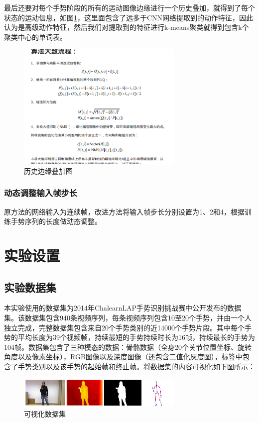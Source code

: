 \documentclass[a4paper, 12pt]{article}
\begin{document}
最后还要对每个手势阶段的所有的运动图像边缘进行一个历史叠加，就得到了每个状态的运动信息，如图\ref{fig:7}，这里面包含了远多于CNN网络提取到的动作特征，因此认为是高级动作特征，然后我们对提取到的特征进行k-means聚类就得到包含k个聚类中心的单词表。

\begin{figure}[ht]
  \centering
  \includegraphics[width=8cm]{canny.png}
  \caption{\label{fig:7}历史边缘叠加图}
\end{figure}

\subsubsection{动态调整输入帧步长}
原方法的网络输入为连续帧，改进方法将输入帧步长分别设置为1、2和4，根据训练手势序列的长度做动态调整。

\section{实验设置}
\subsection{实验数据集}
本实验使用的数据集为2014年ChalearnLAP手势识别挑战赛中公开发布的数据集。该数据集包含940条视频序列，每条视频序列包含10至20个手势，并由一个人独立完成，完整数据集包含来自20个手势类别的近14000个手势片段。其中每个手势的平均长度为39个视频帧，持续最短的手势持续时长为16帧，持续最长的手势为104帧。数据集包含了三种模态的数据：骨骼数据（全身20个关节位置坐标、旋转角度以及像素坐标），RGB图像以及深度图像（还包含二值化灰度图），标签中包含了手势类别以及该手势的起始帧和终止帧。将数据集的内容可视化如下图所示：

\begin{figure}[ht]
  \centering
  \includegraphics[width=8cm]{dataVisual.png}
  \caption{\label{fig:8}可视化数据集}
\end{figure}
\end{document}
